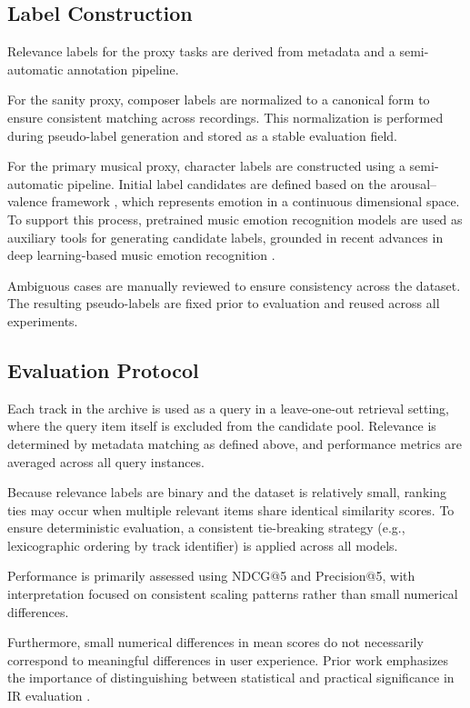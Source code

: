 \documentclass{article}
\begin{document}
\subsection{Label Construction}
Relevance labels for the proxy tasks are derived from metadata and a semi-automatic annotation pipeline.

For the sanity proxy, composer labels are normalized to a canonical form to ensure consistent
matching across recordings. This normalization is performed during pseudo-label generation and
stored as a stable evaluation field.

For the primary musical proxy, character labels are constructed using a semi-automatic pipeline.
Initial label candidates are defined based on the arousal–valence framework 
\cite{eerola2011}, which represents emotion in a continuous dimensional space. 
To support this process, pretrained music emotion recognition models are used as auxiliary tools 
for generating candidate labels, grounded in recent advances in deep learning-based music emotion recognition \cite{jiang2024}.

Ambiguous cases are manually reviewed to ensure consistency across the dataset.
The resulting pseudo-labels are fixed prior to evaluation and reused across all experiments.

\subsection{Evaluation Protocol}
Each track in the archive is used as a query in a leave-one-out retrieval setting, where the query
item itself is excluded from the candidate pool. Relevance is determined by metadata matching as
defined above, and performance metrics are averaged across all query instances.

Because relevance labels are binary and the dataset is relatively small, ranking ties may occur when
multiple relevant items share identical similarity scores. To ensure deterministic evaluation, a
consistent tie-breaking strategy (e.g., lexicographic ordering by track identifier) is applied across
all models.

Performance is primarily assessed using NDCG@5 and Precision@5, with interpretation focused on
consistent scaling patterns rather than small numerical differences.

Furthermore, small numerical differences in mean scores do not necessarily correspond 
to meaningful differences in user experience. Prior work emphasizes the importance 
of distinguishing between statistical and practical significance in IR evaluation 
\cite{urbano2013}.
\end{document}

